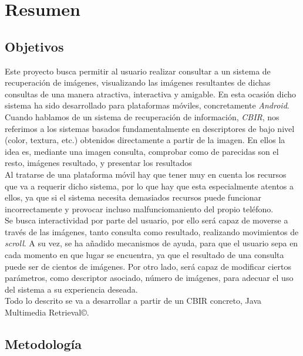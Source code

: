 \chapter{Resumen}
\label{cap:resumen}

\section{Objetivos}

Este proyecto busca permitir al usuario realizar consultar a un sistema de recuperación de imágenes, visualizando las imágenes resultantes de dichas consultas de una manera atractiva, interactiva y amigable. En esta ocasión dicho sistema ha sido desarrollado para plataformas móviles, concretamente \textit{Android}.\\

Cuando hablamos de un sistema de recuperación de información, \textit{CBIR}, nos referimos a los sistemas basados fundamentalmente en descriptores de bajo nivel (color, textura, etc.) obtenidos directamente a partir de la imagen. En ellos la idea es, mediante una imagen consulta, comprobar como de parecidas son el resto, imágenes resultado, y presentar los resultados\\

Al tratarse de una plataforma móvil hay que tener muy en cuenta los recursos que va a requerir dicho sistema, por lo que hay que esta especialmente atentos a ellos, ya que si el sistema necesita demasiados recursos puede funcionar incorrectamente y provocar incluso malfunciomaniento del propio teléfono.\\

Se busca interactividad por parte del usuario, por ello será capaz de moverse a través de las imágenes, tanto consulta como resultado, realizando movimientos de \textit{scroll}. A su vez, se ha añadido mecanismos de ayuda, para que el usuario sepa en cada momento en que lugar se encuentra, ya que el resultado de una consulta puede ser de cientos de imágenes. Por otro lado, será capaz de modificar ciertos parámetros, como descriptor asociado, número de imágenes, para adecuar el uso del sistema a su experiencia deseada.\\

Todo lo descrito se va a desarrollar a partir de un CBIR concreto, Java Multimedia Retrieval©.\\ 

\section{Metodología}

